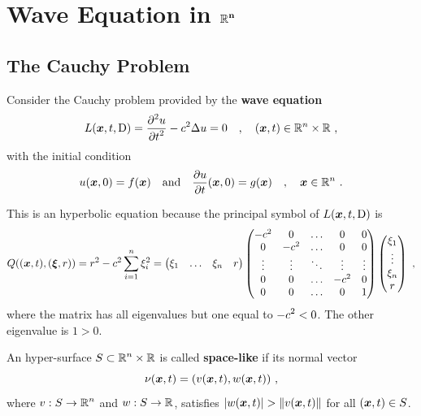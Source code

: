 \chapter{Wave Equation in $\displaystyle \mathbf{\mathbb{R}^n}$} \label{ChapWaveEqunD}

\section{The Cauchy Problem}

Consider the Cauchy problem provided by the
{\bfseries wave equation} 
\begin{equation} \label{wave_nD}
L({\bm{x}},t,\operatorname{D}) = \frac{\displaystyle \partial^{2}{u}} {\displaystyle \partial t^{2}} - c^2 \Delta u = 0 \quad ,
\quad ({\bm{x}},t) \in \mathbb{R}^n \times \mathbb{R} \ ,
\end{equation}
with the initial condition
\begin{equation} \label{wave_nD_cond}
u({\bm{x}}, 0) = f({\bm{x}}) \quad \text{and} \quad
\frac{\partial{u}}{\partial t}({\bm{x}},0) = g({\bm{x}}) \quad , \quad
{\bm{x}} \in \mathbb{R}^n \ .
\end{equation}

This is an hyperbolic equation because the principal symbol of
$L({\bm{x}},t,\operatorname{D})$ is
\[
Q(({\bm{x}},t), ({\bm{\xi}},r)) = r^2 - c^2 \sum_{i=1}^n \xi_i^2 =
\begin{pmatrix}
\xi_1 & \ldots & \xi_n & r
\end{pmatrix}
\begin{pmatrix}
-c^2 & 0 & \ldots & 0 & 0 \\
0 & -c^2 & \ldots & 0 & 0 \\
\vdots & \vdots & \ddots & \vdots & \vdots \\
0 & 0 & \ldots & -c^2 & 0 \\
0 & 0 & \ldots & 0 & 1 \\
\end{pmatrix}
\begin{pmatrix}
\xi_1 \\ \vdots \\ \xi_n \\ r
\end{pmatrix}
\ ,
\]
where the matrix has all eigenvalues but one equal to
$\displaystyle -c^2 <0$.  The other eigenvalue is $1>0$.
\begin{defn}
An hyper-surface $\displaystyle S \subset \mathbb{R}^n \times \mathbb{R}$ is called
{\bfseries space-like} if its normal vector
\[
\nu({\bm{x}},t) = (v({\bm{x}},t),w({\bm{x}},t) ) \ ,
\]
where $\displaystyle v:S \to \mathbb{R}^n$ and $w:S \to \mathbb{R}$,
satisfies $|w({\bm{x}},t)| > \|v({\bm{x}},t) \|$ for all
$({\bm{x}},t) \in S$.
\end{defn}


